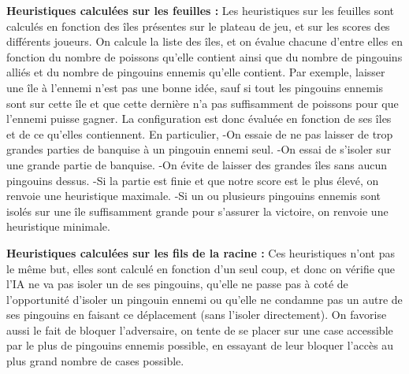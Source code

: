 \documentclass{report}
\begin{document}
\vspace{0.3cm}
\textbf{Heuristiques calculées sur les feuilles :}
\newline
Les heuristiques sur les feuilles sont calculés en fonction des îles présentes sur le plateau de jeu, et sur les scores des différents joueurs.
\newline
On calcule la liste des îles, et on évalue chacune d'entre elles en fonction du nombre de poissons qu'elle contient ainsi que du nombre de pingouins alliés et du nombre de pingouins ennemis qu'elle contient.
\newline
Par exemple, laisser une île à l'ennemi n'est pas une bonne idée, sauf si tout les pingouins ennemis sont sur cette île et que cette dernière n'a pas suffisamment de poissons pour que l'ennemi puisse gagner.
\newline 
La configuration est donc évaluée en fonction de ses îles et de ce qu'elles contiennent.
\newline 
En particulier,
\newline
-On essaie de ne pas laisser de trop grandes parties de banquise à un pingouin ennemi seul.
\newline
-On essai de s'isoler sur une grande partie de banquise. 
\newline
-On évite de laisser des grandes îles sans aucun pingouins dessus. 
\newline
-Si la partie est finie et que notre score est le plus élevé, on renvoie une heuristique maximale.
\newline
-Si un ou plusieurs pingouins ennemis sont isolés sur une île suffisamment grande pour s'assurer la victoire, on renvoie une heuristique minimale.

\vspace{0.3cm}
\textbf{Heuristiques calculées sur les fils de la racine :}
\newline
Ces heuristiques n'ont pas le même but, elles sont calculé en fonction d'un seul coup, et donc on vérifie que l'IA ne va pas isoler un de ses pingouins, qu'elle ne passe pas à coté de l'opportunité d'isoler un pingouin ennemi ou qu'elle ne condamne pas un autre de ses pingouins en faisant ce déplacement (sans l'isoler directement).
\newline
On favorise aussi le fait de bloquer l'adversaire, on tente de se placer sur une case accessible par le plus de pingouins ennemis possible, en essayant de leur bloquer l'accès au plus grand nombre de cases possible.
\vspace{0.3cm}
\end{document}
